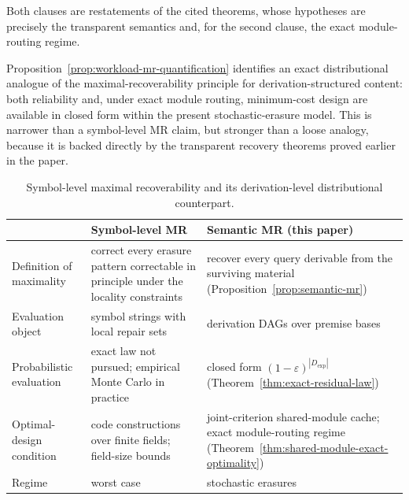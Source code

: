 \documentclass[journal]{IEEEtran}
\makeatletter
\numberwithin{equation}{section}
\renewenvironment{proof}[1][\proofname]{\par
  \pushQED{\qed}%
  \normalfont \topsep6\p@\@plus6\p@\relax
  \trivlist
  \item[\hskip\labelsep
        \itshape
    #1\@addpunct{.}]\ignorespaces
}{%
  \popQED\endtrivlist\@endpefalse
}
\makeatother
\begin{document}
\begin{proof}
Both clauses are restatements of the cited theorems, whose hypotheses
are precisely the transparent semantics and, for the second clause, the
exact module-routing regime.
\end{proof}

Proposition~\ref{prop:workload-mr-quantification} identifies an exact
distributional analogue of the maximal-recoverability principle for
derivation-structured content: both reliability and, under exact module
routing, minimum-cost design are available in closed form within the
present stochastic-erasure model.  This is narrower than a symbol-level MR
claim, but stronger than a loose analogy, because it is backed directly by
the transparent recovery theorems proved earlier in the paper.

\begin{table}[t]
\caption{Symbol-level maximal recoverability and its derivation-level
distributional counterpart.}
\label{tab:mr-contrast}
\centering\footnotesize
\begin{tabularx}{\columnwidth}{@{}p{}LL@{}}
\toprule
 & Symbol-level MR~\cite{martinez2026maximally} & Semantic MR (this
paper) \\
\midrule
Definition of maximality & correct every erasure pattern correctable in
principle under the locality constraints & recover every query derivable
from the surviving material
(Proposition~\ref{prop:semantic-mr}) \\
Evaluation object & symbol strings with local repair sets & derivation
DAGs over premise bases \\
Probabilistic evaluation & exact law not pursued; empirical Monte Carlo in
practice & closed form \((1-\varepsilon)^{|D_{\mathrm{exp}}|}\)
(Theorem~\ref{thm:exact-residual-law}) \\
Optimal-design condition & code constructions over finite fields;
field-size bounds & joint-criterion shared-module cache; exact
module-routing regime
(Theorem~\ref{thm:shared-module-exact-optimality}) \\
Regime & worst case & stochastic erasures \\
\bottomrule
\end{tabularx}
\end{table}
\end{document}
